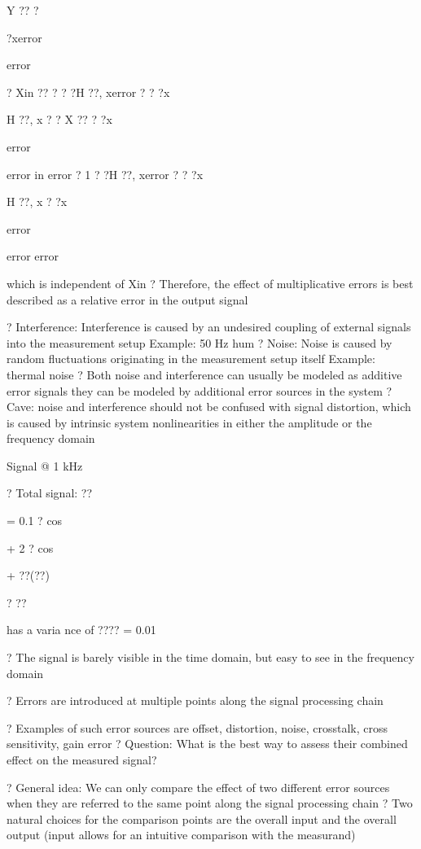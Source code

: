 \documentclass[2pt,landscape]{article}
\begin{document}
\begin{multicols*}{5}
Y ?? ?


?xerror


error


?	Xin ?? ?	? ?H ??, xerror ? ? ?x


H ??, x	? ? X ?? ?	?x


error


error	in	error
?	1	? ?H ??, xerror ? ? ?x


H ??, x	?	?x


error


error	error

which is independent of Xin
?	Therefore, the effect of multiplicative errors is best described as a 
relative error in the output signal



?	Interference:
\textbullet 	Interference is caused by an undesired coupling of external signals into the 
measurement setup
\textbullet 	Example: 50 Hz hum
?	Noise:
\textbullet 	Noise is caused by random fluctuations originating in the measurement 
setup itself
\textbullet 	Example: thermal noise
?	Both noise and interference can usually be modeled as additive error 
signals
they can be modeled by additional error sources in the system
?	Cave: noise and interference should not be confused with signal 
distortion, which is caused by intrinsic system nonlinearities in either 
the amplitude or the frequency domain


Signal @ 1 kHz




?	Total signal: ??


= 0.1 ? cos


+ 2 ? cos


+ ??(??)





?	??


has 
a 
varia
nce 
of ???? 
= 
0.01


?	The signal is barely visible in the time domain, but easy to see in the 
frequency domain



?	Errors are introduced at multiple points along the signal processing 
chain

?	Examples of such error sources are offset, distortion, noise, crosstalk, 
cross sensitivity, gain error \textbullet 
?	Question: What is the best way to assess their combined effect on the 
measured signal?



?	General idea: We can only compare the effect of two different error sources 
when they are referred to the same point along the signal processing chain
?	Two natural choices for the comparison points are the overall input and the
overall output (input allows for an intuitive comparison with the measurand)








\end{multicols*}
\end{document}
